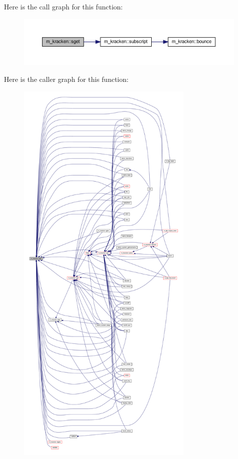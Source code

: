 Here is the call graph for this function\+:
\nopagebreak
\begin{figure}[H]
\begin{center}
\leavevmode
\includegraphics[width=350pt]{namespacem__kracken_a9a64192326816b0b9badcc11506628ee_cgraph}
\end{center}
\end{figure}
Here is the caller graph for this function\+:
\nopagebreak
\begin{figure}[H]
\begin{center}
\leavevmode
\includegraphics[height=550pt]{namespacem__kracken_a9a64192326816b0b9badcc11506628ee_icgraph}
\end{center}
\end{figure}
\mbox{\label{namespacem__kracken_a8ae60c1a9c903c8ad06ef1f95975d457}} 
